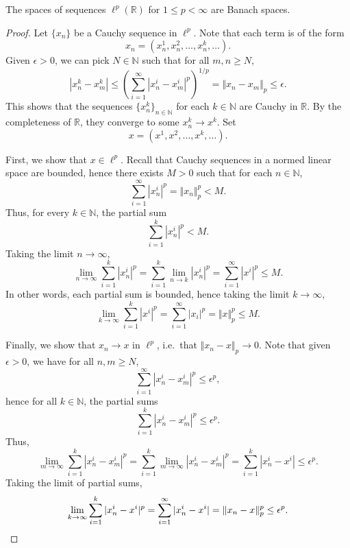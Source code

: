 \documentclass[11pt]{article}
\newcommand{\R}{\mathbb{R}}
\newcommand{\N}{\mathbb{N}}
\newcommand{\norm}[1]{\Vert #1 \Vert}
\theoremstyle{definition}
\theoremstyle{remark}
\begin{document}
    \begin{lemma}
        The spaces of sequences $\ell^p(\R)$ for $1 \leq p < \infty$ are Banach
        spaces.
    \end{lemma}
    \begin{proof}
        Let $\{x_n\}$ be a Cauchy sequence in $\ell^p$. Note that each term is of the
        form \[
            x_n = (x_n^1, x_n^2, \dots, x_n^k, \dots).
        \] Given $\epsilon > 0$, we can pick $N \in \N$ such that for all $m, n \geq
        N$, \[
            |x_n^k - x_m^k| \leq \left(\sum_{i = 1}^\infty |x_n^i -
            x_m^i|^p\right)^{1 / p} = \norm{x_n - x_m}_p \leq \epsilon.
        \] This shows that the sequences $\{x_n^k\}_{n \in \N}$ for each $k \in \N$
        are Cauchy in $\R$. By the completeness of $\R$, they converge to some $x_n^k
        \to x^k$. Set \[
            x = (x^1, x^2, \dots, x^k, \dots).
        \]

        First, we show that $x \in \ell^p$. Recall that Cauchy sequences in a normed
        linear space are bounded, hence there exists $M > 0$ such that for each $n
        \in \N$, \[
            \sum_{i = 1}^\infty |x_n^i|^p = \norm{x_n}_p^p < M.
        \] Thus, for every $k \in \N$, the partial sum \[
            \sum_{i = 1}^k |x_n^i|^p < M.
        \] Taking the limit $n \to \infty$, \[
            \lim_{n \to \infty} \sum_{i = 1}^k |x_n^i|^p = \sum_{i = 1}^k \lim_{n \to
            k} |x_n^i|^p = \sum_{i = 1}^\infty |x^i|^p \leq M.
        \] In other words, each partial sum is bounded, hence taking the limit $k \to
        \infty$, \[
            \lim_{k \to \infty} \sum_{i = 1}^k |x^i|^p = \sum_{i = 1}^\infty |x_i|^p
            = \norm{x}_p^p \leq M.
        \]

        Finally, we show that $x_n \to x$ in $\ell^p$, i.e.\ that $\norm{x_n - x}_p
        \to 0$. Note that given $\epsilon > 0$, we have for all $n, m \geq N$, \[
            \sum_{i = 1}^\infty |x_n^i - x_m^i|^p \leq \epsilon^p,
        \] hence for all $k \in \N$, the partial sums \[
            \sum_{i = 1}^k |x_n^i - x_m^i|^p \leq \epsilon^p.
        \] Thus, \[
            \lim_{m \to \infty} \sum_{i = 1}^k |x_n^i - x_m^i|^p = \sum_{i = 1}^k
            \lim_{m \to \infty} |x_n^i - x_m^i|^p = \sum_{i = 1}^k |x_n^i - x^i| \leq
            \epsilon^p.
        \] Taking the limit of partial sums, \[
            \lim_{k \to \infty} \sum_{i = 1}^k |x_n^i - x^i|^p = \sum_{i = 1}^\infty
            |x_n^i - x^i| = \norm{x_n - x}_p^p \leq \epsilon^p. \qedhere
        \]
    \end{proof}
\end{document}
